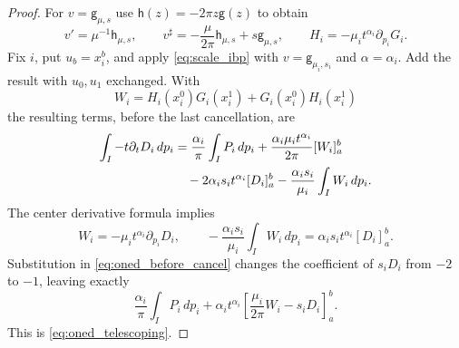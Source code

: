 \documentclass[12pt,reqno]{amsart}
\theoremstyle{plain}
\theoremstyle{definition}
\theoremstyle{remark}
\numberwithin{equation}{section}
\newcommand{\g}{\mathsf g}
\newcommand{\h}{\mathsf h}
\newcommand{\dd}{\,d}
\begin{document}
\begin{proof}
For $v=\g_{\mu,s}$ use $\h(z)=-2\pi z\g(z)$ to obtain
\[
 v'=\mu^{-1}\h_{\mu,s},\qquad
 v^\sharp=-\frac{\mu}{2\pi}\h_{\mu,s}+s\g_{\mu,s},\qquad
 H_i=-\mu_it^{\alpha_i}\partial_{p_i}G_i.
\]
Fix $i$, put $u_b=x_i^b$, and apply \eqref{eq:scale_ibp} with
$v=\g_{\mu_i,s_i}$ and $\alpha=\alpha_i$. Add the result with
$u_0,u_1$ exchanged. With
\[
 W_i=H_i(x_i^0)G_i(x_i^1)+G_i(x_i^0)H_i(x_i^1)
\]
the resulting terms, before the last cancellation, are
\begin{align}
 \int_I-t\partial_tD_i\dd p_i
 &=\frac{\alpha_i}{\pi}\int_IP_i\dd p_i
    +\frac{\alpha_i\mu_i t^{\alpha_i}}{2\pi}[W_i]_{a}^{b}\notag\\
 &\quad-2\alpha_i s_it^{\alpha_i}[D_i]_{a}^{b}
    -\frac{\alpha_i s_i}{\mu_i}\int_IW_i\dd p_i.
                                                  \label{eq:oned_before_cancel}
\end{align}
The center derivative formula implies
\[
 W_i=-\mu_it^{\alpha_i}\partial_{p_i}D_i,
 \qquad
 -\frac{\alpha_i s_i}{\mu_i}\int_IW_i\dd p_i
       =\alpha_i s_it^{\alpha_i}[D_i]_{a}^{b}.
\]
Substitution in \eqref{eq:oned_before_cancel} changes the coefficient
of $s_iD_i$ from $-2$ to $-1$, leaving exactly
\[
 \frac{\alpha_i}{\pi}\int_IP_i\dd p_i
 +\alpha_it^{\alpha_i}
        \left[\frac{\mu_i}{2\pi}W_i-s_iD_i\right]_{a}^{b}.
\]
This is \eqref{eq:oned_telescoping}.
\end{proof}
\end{document}
